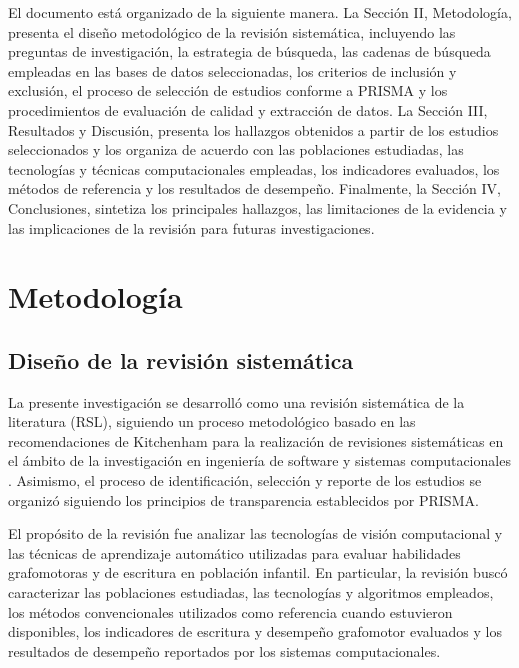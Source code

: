 \documentclass{iaesarticle}
\begin{document}
El documento está organizado de la siguiente manera. La Sección II, Metodología, presenta el diseño metodológico de la revisión sistemática, incluyendo las preguntas de investigación, la estrategia de búsqueda, las cadenas de búsqueda empleadas en las bases de datos seleccionadas, los criterios de inclusión y exclusión, el proceso de selección de estudios conforme a PRISMA y los procedimientos de evaluación de calidad y extracción de datos. La Sección III, Resultados y Discusión, presenta los hallazgos obtenidos a partir de los estudios seleccionados y los organiza de acuerdo con las poblaciones estudiadas, las tecnologías y técnicas computacionales empleadas, los indicadores evaluados, los métodos de referencia y los resultados de desempeño. Finalmente, la Sección IV, Conclusiones, sintetiza los principales hallazgos, las limitaciones de la evidencia y las implicaciones de la revisión para futuras investigaciones.








\section{Metodología}

\subsection{Diseño de la revisión sistemática}

La presente investigación se desarrolló como una revisión sistemática de la literatura (RSL), siguiendo un proceso metodológico basado en las recomendaciones de Kitchenham para la realización de revisiones sistemáticas en el ámbito de la investigación en ingeniería de software y sistemas computacionales \cite{kitchenham2007}. Asimismo, el proceso de identificación, selección y reporte de los estudios se organizó siguiendo los principios de transparencia establecidos por PRISMA.

El propósito de la revisión fue analizar las tecnologías de visión computacional y las técnicas de aprendizaje automático utilizadas para evaluar habilidades grafomotoras y de escritura en población infantil. En particular, la revisión buscó caracterizar las poblaciones estudiadas, las tecnologías y algoritmos empleados, los métodos convencionales utilizados como referencia cuando estuvieron disponibles, los indicadores de escritura y desempeño grafomotor evaluados y los resultados de desempeño reportados por los sistemas computacionales.
\end{document}
